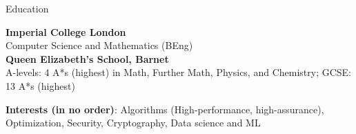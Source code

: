 \documentclass[10pt]{resume} %
\begin{document}

\begin{rSection}{Education}

{\bf Imperial College London} \hfill \\
Computer Science and Mathematics (BEng)\\

{\bf Queen Elizabeth's School, Barnet} \\
A-levels: 4 A*s (highest) in Math, Further Math, Physics, and Chemistry;
GCSE: 13 A*s (highest)


\textbf{Interests (in no order)}:
  Algorithms (High-performance, high-assurance),
  Optimization,
  Security,
  Cryptography,
  Data science and ML


\end{rSection}

\end{document}
